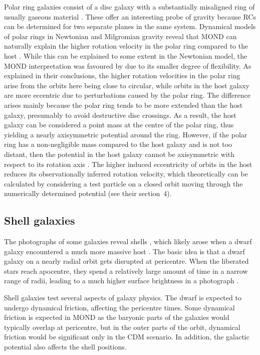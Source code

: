\documentclass[fleqn,usenatbib,useAMS,onecolumn]{mnras} %
\begin{document}
Polar ring galaxies \citep{Bertola_1978} consist of a disc galaxy with a substantially misaligned ring of usually gaseous material \citep[for a review, see][]{Combes_2014_polar_rings}. These offer an interesting probe of gravity because RCs can be determined for two separate planes in the same system. Dynamical models of polar rings in Newtonian and Milgromian gravity reveal that MOND can naturally explain the higher rotation velocity in the polar ring compared to the host \citep{Lughausen_2013}. While this can be explained to some extent in the Newtonian model, the MOND interpretation was favoured by \citet{Lughausen_2014} due to its smaller degree of flexibility. As explained in their conclusions, the higher rotation velocities in the polar ring arise from the orbits here being close to circular, while orbits in the host galaxy are more eccentric due to perturbations caused by the polar ring. The difference arises mainly because the polar ring tends to be more extended than the host galaxy, presumably to avoid destructive disc crossings. As a result, the host galaxy can be considered a point mass at the centre of the polar ring, thus yielding a nearly axisymmetric potential around the ring. However, if the polar ring has a non-negligible mass compared to the host galaxy and is not too distant, then the potential in the host galaxy cannot be axisymmetric with respect to its rotation axis \citep{Lughausen_2013}. The higher induced eccentricity of orbits in the host reduces its observationally inferred rotation velocity, which theoretically can be calculated by considering a test particle on a closed orbit moving through the numerically determined potential (see their section~4).



\subsection{Shell galaxies}
\label{Shell_galaxies}

The photographs of some galaxies reveal shells \citep{Schweizer_1980}, which likely arose when a dwarf galaxy encountered a much more massive host \citep{Quinn_1984}. The basic idea is that a dwarf galaxy on a nearly radial orbit gets disrupted at pericentre. When the liberated stars reach apocentre, they spend a relatively large amount of time in a narrow range of radii, leading to a much higher surface brightness in a photograph \citep{Hernquist_1987}.

Shell galaxies test several aspects of galaxy physics. The dwarf is expected to undergo dynamical friction, affecting the pericentre times. Some dynamical friction is expected in MOND as the baryonic parts of the galaxies would typically overlap at pericentre, but in the outer parts of the orbit, dynamical friction would be significant only in the CDM scenario. In addition, the galactic potential also affects the shell positions.
\end{document}
